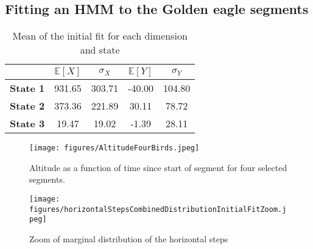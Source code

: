 \subsection{Fitting an HMM to the Golden eagle segments}\label{goldenEagleSegments}
\begin{table}[ht]
    \centering
    \begin{tabular}{lcccc}
      \hline
      & $\mathbb{E}\left[X\right]$ & $\sigma_X$ & $\mathbb{E}\left[Y\right]$ & $\sigma_Y$ \\ 
      \hline
      \textbf{State 1} & 931.65 & 303.71 & -40.00 & 104.80 \\ 
      \textbf{State 2} & 373.36 & 221.89 & 30.11 & 78.72 \\ 
      \textbf{State 3} & 19.47 & 19.02 & -1.39 & 28.11 \\ 
       \hline
    \end{tabular}
    \caption{Mean of the initial fit for each dimension and state}
    \label{initialFitMeans}
\end{table}
\begin{figure}[h]
    \begin{center}
        \texttt{[image: figures/AltitudeFourBirds.jpeg]}
    \end{center}
    \caption{Altitude as a function of time since start of segment for four selected segments.}
    \label{fourSegments}
\end{figure}
\newpage
\begin{figure}[h]
    \begin{center}
        \texttt{[image: figures/horizontalStepsCombinedDistributionInitialFitZoom.jpeg]}
    \end{center}
    \caption{Zoom of marginal distribution of the horizontal steps}
    \label{zoomHorizontal}
\end{figure}
\newpage

